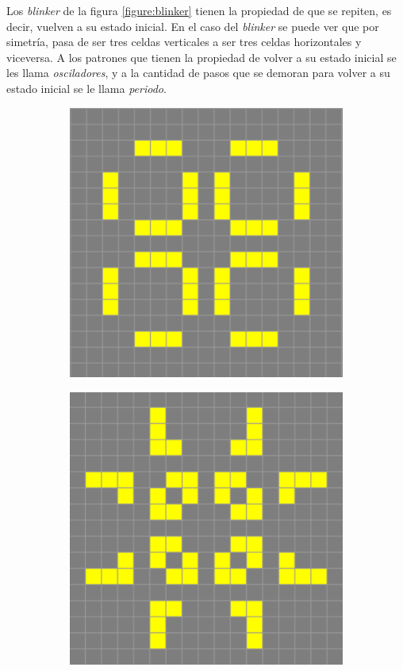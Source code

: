 Los \textit{blinker} de la figura \ref{figure:blinker} tienen la propiedad de que se repiten, es decir, vuelven a su estado inicial. En el caso del \textit{blinker} se puede ver que por simetr\'ia, pasa de ser tres celdas verticales a ser tres celdas horizontales y viceversa. A los patrones que tienen la propiedad de volver a su estado inicial se les llama \textit{osciladores}, y a la cantidad de pasos que se demoran para volver a su estado inicial se le llama \textit{periodo}.

\begin{figure}[h]
    \centering
    \begin{subfigure}{0.3\textwidth}
        \includegraphics[width=\textwidth]{images/life-pulsar-1.png}
    \end{subfigure}
    \begin{subfigure}{0.3\textwidth}
        \includegraphics[width=\textwidth]{images/life-pulsar-2.png}

\end{subfigure}
\end{figure}

